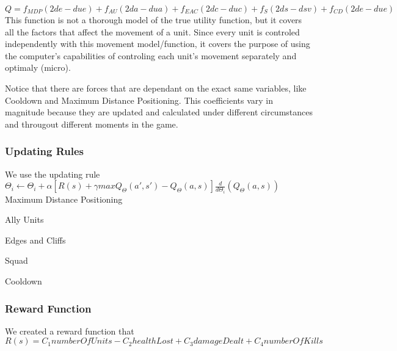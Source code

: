 $Q = f_{MDP} (2de - due) + f_{AU} (2da - dua) + f_{EAC} (2dc - duc) + f_{S}  (2ds - dsv) + f_{CD} (2de - due)$ \\ 

This function is not a thorough model of the true utility function, but it covers all the factors that affect the movement of a unit. Since every unit is controled independently with this movement model/function, it covers the purpose of using the computer's capabilities of controling each unit's movement separately and optimaly (micro).

Notice that there are forces that are dependant on the exact same variables, like Cooldown and Maximum Distance Positioning. This coefficients vary in magnitude because they are updated and calculated under different circumstances and througout different moments in the game. 

\subsubsection{Updating Rules}

We use the updating rule \\ 
 
$\Theta_i \leftarrow \Theta_i + \alpha [ R(s) + \gamma maxQ_\Theta(a',s')-Q_\Theta(a,s) ] \frac{d}{d\Theta_i}(Q_\Theta(a,s))$ \\ 

Maximum Distance Positioning

Ally Units

Edges and Cliffs

Squad

Cooldown



\subsubsection{Reward Function}

We created a reward function that \\ 

$R(s) = C_1 numberOfUnits  -  C_2 healthLost  +   C_3 damageDealt  +   C_4 numberOfKills$ \\ 






